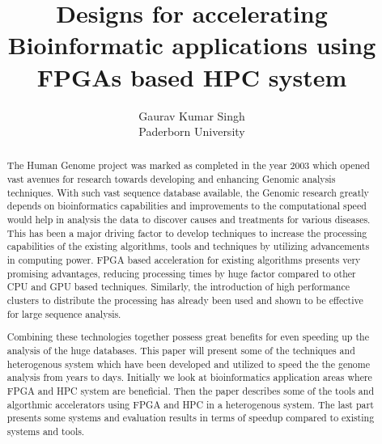 \documentclass[12pt,twoside]{article}
\newcommand{\participant}{Gaurav Kumar Singh}
\newcommand{\affiliation}{Paderborn University}
\newcommand{\topic}{Designs for accelerating Bioinformatic applications using FPGAs based HPC system}
\begin{document}
\title{\topic}
\author{\Large{\participant}\\ \affiliation \\ {\small \emailaddress}}
\date{}
\maketitle
\thispagestyle{empty}


\begin{abstract}

 The Human Genome project was marked as completed in the year 2003 which opened vast avenues 
 for research towards developing and enhancing Genomic analysis techniques. With such vast sequence
 database available, the Genomic research greatly depends on bioinformatics capabilities and improvements
 to the computational speed would help in analysis the data to discover causes and treatments for various
 diseases. This has been a major driving factor to develop techniques to increase the  processing
 capabilities of the  existing algorithms, tools and techniques by utilizing advancements in computing power.
 FPGA based acceleration for existing algorithms presents very promising advantages, reducing processing times
 by huge factor compared to other CPU and GPU based techniques. Similarly, the introduction of high performance
 clusters to distribute the processing has already been used and shown to be effective for large sequence analysis.

 Combining these technologies together possess great benefits for even speeding up the analysis of the huge databases.
 This paper will present some of the techniques and heterogenous system which have been developed and utilized to
 speed the the genome analysis from years to days. Initially we look at bioinformatics application areas where
 FPGA and HPC system are beneficial. Then the paper describes some of the tools and algorthmic accelerators
 using FPGA and HPC in a heterogenous system. The last part presents some systems and evaluation
 results in terms of speedup compared to existing systems and tools.

\end{abstract}

\end{document}
